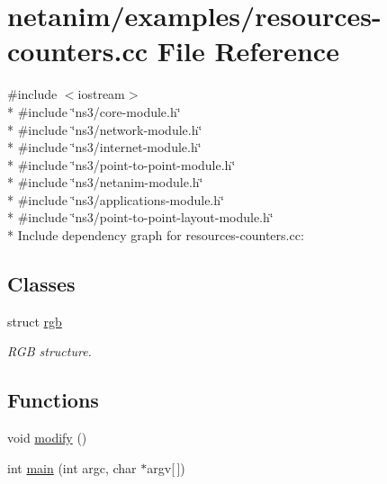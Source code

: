 \hypertarget{resources-counters_8cc}{}\section{netanim/examples/resources-\/counters.cc File Reference}
\label{resources-counters_8cc}
{\ttfamily \#include $<$iostream$>$}\\*
{\ttfamily \#include \char`\"{}ns3/core-\/module.\+h\char`\"{}}\\*
{\ttfamily \#include \char`\"{}ns3/network-\/module.\+h\char`\"{}}\\*
{\ttfamily \#include \char`\"{}ns3/internet-\/module.\+h\char`\"{}}\\*
{\ttfamily \#include \char`\"{}ns3/point-\/to-\/point-\/module.\+h\char`\"{}}\\*
{\ttfamily \#include \char`\"{}ns3/netanim-\/module.\+h\char`\"{}}\\*
{\ttfamily \#include \char`\"{}ns3/applications-\/module.\+h\char`\"{}}\\*
{\ttfamily \#include \char`\"{}ns3/point-\/to-\/point-\/layout-\/module.\+h\char`\"{}}\\*
Include dependency graph for resources-\/counters.cc\+:
\subsection*{Classes}
\begin{DoxyCompactItemize}
\item 
struct \hyperlink{structrgb}{rgb}
\begin{DoxyCompactList}\small\item\em R\+GB structure. \end{DoxyCompactList}\end{DoxyCompactItemize}
\subsection*{Functions}
\begin{DoxyCompactItemize}
\item 
void \hyperlink{resources-counters_8cc_a7a2a3abb755d0d1a31414355520d054b}{modify} ()
\item 
int \hyperlink{resources-counters_8cc_a0ddf1224851353fc92bfbff6f499fa97}{main} (int argc, char $\ast$argv\mbox{[}$\,$\mbox{]})
\end{DoxyCompactItemize}
